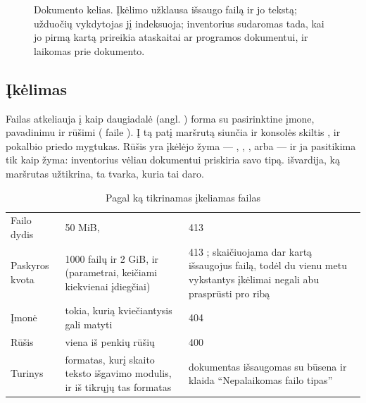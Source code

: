 \begin{figure}[H]
\actorlegend
\caption{Dokumento kelias. Įkėlimo užklausa išsaugo failą ir jo tekstą; užduočių vykdytojas jį
indeksuoja; inventorius sudaromas tada, kai jo pirmą kartą prireikia ataskaitai ar programos
dokumentui, ir laikomas prie dokumento.}\label{fig:company:path}
\end{figure}

\subsection{Įkėlimas}\label{sec:company:upload}

Failas atkeliauja į  kaip daugiadalė (angl. ) forma su
pasirinktine įmone, pavadinimu ir rūšimi ( faile
). Į tą patį maršrutą siunčia ir konsolės skiltis
, ir pokalbio priedo mygtukas. Rūšis yra įkėlėjo žyma --- ,
, ,  arba  --- ir ja pasitikima tik kaip
žyma: inventorius vėliau dokumentui priskiria savo tipą. 
išvardija, ką maršrutas užtikrina, ta tvarka, kuria tai daro.

\begin{table}[H]
\caption{Pagal ką tikrinamas įkeliamas failas}\label{tab:company:limits}
\begin{tabularx}{\textwidth}{@{}L{31mm}L{50mm}Y@{}}
\toprule
{} &  &  \\
\midrule
Failo dydis & 50 MiB,  & 413  \\
Paskyros kvota & 1000 failų ir 2 GiB,  ir
   (parametrai, keičiami kiekvienai įdiegčiai) & 413
  ; skaičiuojama dar kartą išsaugojus failą, todėl du vienu metu
  vykstantys įkėlimai negali abu prasprūsti pro ribą \\
Įmonė & tokia, kurią kviečiantysis gali matyti & 404  \\
Rūšis & viena iš penkių rūšių & 400  \\
Turinys & formatas, kurį skaito teksto išgavimo modulis, ir iš tikrųjų tas formatas & dokumentas
  išsaugomas su būsena  ir klaida \enquote{Nepalaikomas failo tipas} \\
\bottomrule
\end{tabularx}
\end{table}

